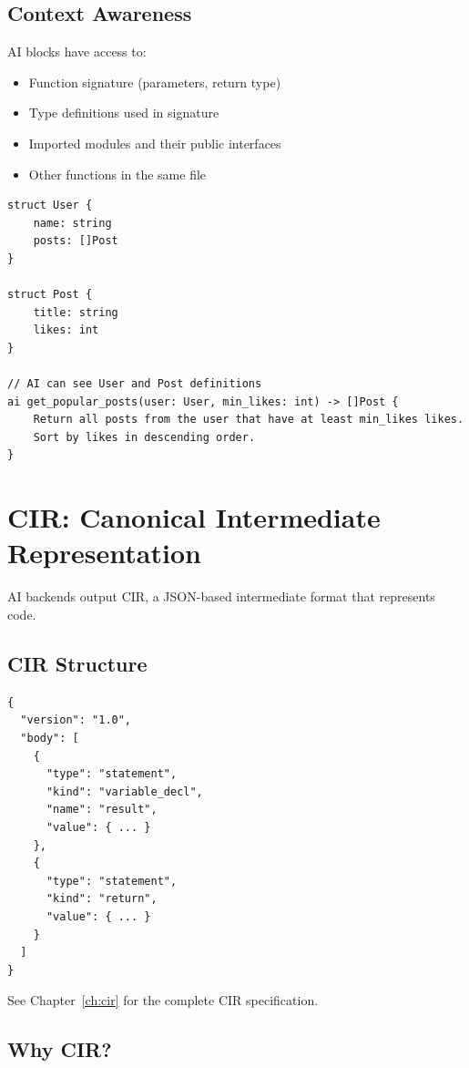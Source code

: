 \subsection{Context Awareness}

AI blocks have access to:

\begin{itemize}
    \item Function signature (parameters, return type)
    \item Type definitions used in signature
    \item Imported modules and their public interfaces
    \item Other functions in the same file
\end{itemize}

\begin{lstlisting}
struct User {
    name: string
    posts: []Post
}

struct Post {
    title: string
    likes: int
}

// AI can see User and Post definitions
ai get_popular_posts(user: User, min_likes: int) -> []Post {
    Return all posts from the user that have at least min_likes likes.
    Sort by likes in descending order.
}
\end{lstlisting}

\section{CIR: Canonical Intermediate Representation}

AI backends output CIR, a JSON-based intermediate format that represents \haira{} code.

\subsection{CIR Structure}

\begin{lstlisting}[language={}]
{
  "version": "1.0",
  "body": [
    {
      "type": "statement",
      "kind": "variable_decl",
      "name": "result",
      "value": { ... }
    },
    {
      "type": "statement",
      "kind": "return",
      "value": { ... }
    }
  ]
}
\end{lstlisting}

See Chapter~\ref{ch:cir} for the complete CIR specification.

\subsection{Why CIR?}

